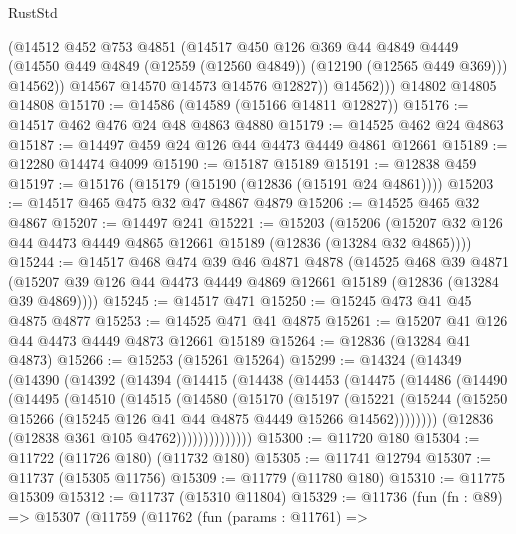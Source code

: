 \begin{lexlean}{RustStd}
\begin{coremodule}
              (@14512
                @452
                @753
                @4851
                (@14517
                  @450
                  @126
                  @369
                  @44
                  @4849
                  @4449
                  (@14550 @449 @4849 (@12559 (@12560 @4849)) (@12190 (@12565 @449 @369)))
                  @14562))
              @14567
              @14570
              @14573
              @14576
              @12827))
          @14562)))
    @14802
    @14805
    @14808
@15170 := @14586 (@14589 (@15166 @14811 @12827))
@15176 := @14517 @462 @476 @24 @48 @4863 @4880
@15179 := @14525 @462 @24 @4863
@15187 := @14497 @459 @24 @126 @44 @4473 @4449 @4861 @12661
@15189 := @12280 @14474 @4099
@15190 := @15187 @15189
@15191 := @12838 @459
@15197 := @15176 (@15179 (@15190 (@12836 (@15191 @24 @4861))))
@15203 := @14517 @465 @475 @32 @47 @4867 @4879
@15206 := @14525 @465 @32 @4867
@15207 := @14497 @241
@15221 := @15203
    (@15206 (@15207 @32 @126 @44 @4473 @4449 @4865 @12661 @15189 (@12836 (@13284 @32 @4865))))
@15244 := @14517
    @468
    @474
    @39
    @46
    @4871
    @4878
    (@14525
      @468
      @39
      @4871
      (@15207 @39 @126 @44 @4473 @4449 @4869 @12661 @15189 (@12836 (@13284 @39 @4869))))
@15245 := @14517 @471
@15250 := @15245 @473 @41 @45 @4875 @4877
@15253 := @14525 @471 @41 @4875
@15261 := @15207 @41 @126 @44 @4473 @4449 @4873 @12661 @15189
@15264 := @12836 (@13284 @41 @4873)
@15266 := @15253 (@15261 @15264)
@15299 := @14324
    (@14349
      (@14390
        (@14392
          (@14394
            (@14415
              (@14438
                (@14453
                  (@14475
                    (@14486
                      (@14490
                        (@14495
                          (@14510
                            (@14515
                              (@14580
                                (@15170
                                  (@15197
                                    (@15221
                                      (@15244
                                        (@15250
                                          @15266
                                          (@15245 @126 @41 @44 @4875 @4449 @15266 @14562))))))))
                            (@12836 (@12838 @361 @105 @4762))))))))))))))
@15300 := @11720 @180
@15304 := @11722 (@11726 @180) (@11732 @180)
@15305 := @11741 @12794
@15307 := @11737 (@15305 @11756)
@15309 := @11779 (@11780 @180)
@15310 := @11775 @15309
@15312 := @11737 (@15310 @11804)
@15329 := @11736
    (fun (fn : @89) =>
    @15307
      (@11759
        (@11762
          (fun (params : @11761) =>

\end{coremodule}
\end{lexlean}
